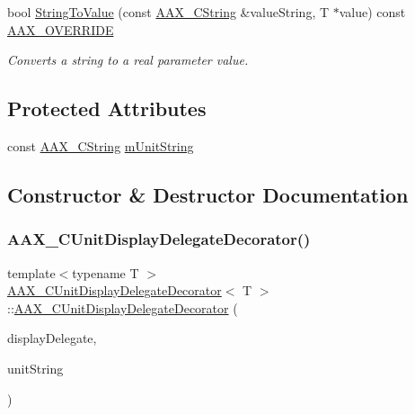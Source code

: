 \begin{DoxyCompactItemize}
bool \mbox{\hyperlink{a01585_a4577b27d63067a75deead21c25f1b932}{String\+To\+Value}} (const \mbox{\hyperlink{a01573}{A\+A\+X\+\_\+\+C\+String}} \&value\+String, T $\ast$value) const \mbox{\hyperlink{a00392_ac2f24a5172689ae684344abdcce55463}{A\+A\+X\+\_\+\+O\+V\+E\+R\+R\+I\+DE}}
\begin{DoxyCompactList}\small\item\em Converts a string to a real parameter value. \end{DoxyCompactList}\end{DoxyCompactItemize}
\subsection*{Protected Attributes}
\begin{DoxyCompactItemize}
\item 
const \mbox{\hyperlink{a01573}{A\+A\+X\+\_\+\+C\+String}} \mbox{\hyperlink{a01585_a4ea845f56cbb837f9b45901f022336d0}{m\+Unit\+String}}
\end{DoxyCompactItemize}


\subsection{Constructor \& Destructor Documentation}
\mbox{\label{a01585_ad1ade911fb13a394a65a26e159035318}} 
\subsubsection{\texorpdfstring{AAX\_CUnitDisplayDelegateDecorator()}{AAX\_CUnitDisplayDelegateDecorator()}}
{\footnotesize\ttfamily template$<$typename T $>$ \\
\mbox{\hyperlink{a01585}{A\+A\+X\+\_\+\+C\+Unit\+Display\+Delegate\+Decorator}}$<$ T $>$\+::\mbox{\hyperlink{a01585}{A\+A\+X\+\_\+\+C\+Unit\+Display\+Delegate\+Decorator}} (\begin{DoxyParamCaption}\item[{const \mbox{\hyperlink{a01801}{A\+A\+X\+\_\+\+I\+Display\+Delegate}}$<$ T $>$ \&}]{display\+Delegate,  }\item[{const \mbox{\hyperlink{a01573}{A\+A\+X\+\_\+\+C\+String}} \&}]{unit\+String }\end{DoxyParamCaption})}



